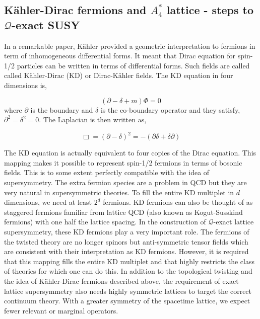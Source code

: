 \subsection{K\"{a}hler-Dirac fermions and $A_{4}^{*}$ lattice - steps to $\mathcal{Q}$-exact SUSY} 

In a remarkable paper, K\"{a}hler provided a geometric interpretation to fermions in term of inhomogeneous differential forms. 
It meant that Dirac equation for spin-1/2 particles can be written in terms of differential forms. Such fields are called called
K\"{a}hler-Dirac (KD) or Dirac-K\"{a}hler fields. The KD equation in four dimensions is, 

\begin{equation}
(\partial - \delta + m) \Phi = 0 
\end{equation}
where $\partial$ is the boundary and $\delta$ is the co-boundary operator and they satisfy, $\partial^2 = \delta^2 = 0$. The Laplacian is then written as,

\begin{equation}
\Box = (\partial - \delta)^{2} = -(\partial \delta + \delta \partial)
\end{equation}

The KD equation is actually equivalent to four copies of the Dirac equation. This mapping makes it possible to represent 
spin-1/2 fermions in terms of bosonic fields. This is to some extent perfectly compatible with the idea of supersymmetry. 
The extra fermion species are a problem in QCD but they are very natural in supersymmetric theories. To fill the entire 
KD multiplet in $d$ dimensions, we need at least $2^d$ fermions. KD fermions can also be thought of as 
staggered fermions familiar from lattice QCD (also known as Kogut-Susskind fermions) with one half the lattice spacing. 
In the construction of $\mathcal{Q}$-exact lattice supersymmetry, these KD fermions play a very important role. 
The fermions of the twisted theory are no longer spinors but anti-symmetric tensor fields which are consistent with 
their interpretation as KD fermions. However, it is required that this mapping fills the entire KD multiplet and that 
highly restricts the class of theories for which one can do this. In addition to the topological twisting 
and the idea of K\"{a}hler-Dirac fermions described above, the requirement of 
exact lattice supersymmetry also needs highly symmetric lattices to target the correct continuum theory. 
With a greater symmetry of the spacetime lattice, we expect fewer relevant or marginal operators.  

